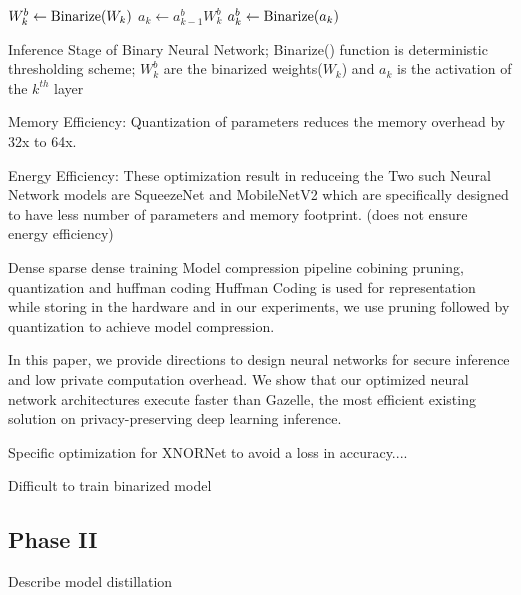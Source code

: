 \begin{algorithm}
\begin{algorithmic}
        \STATE $W_k^b \leftarrow {\rm Binarize}(W_k)$
        \STATE $a_k \leftarrow a_{k-1}^b W_k^b$
            \STATE $a_k^b \leftarrow {\rm Binarize}(a_k)$
        \ENDIF
    \ENDFOR

\end{algorithmic}
\caption{
Inference Stage of Binary Neural Network; Binarize() function is deterministic thresholding scheme; $W_k^b$ are the binarized weights($W_k$) and $a_k$ is the activation of the $k^{th}$ layer
}
\label{alg:train}
\end{algorithm}

Memory Efficiency: Quantization of parameters reduces the memory overhead by 32x to 64x.

Energy Efficiency: These optimization result in reduceing the
Two such Neural Network models are SqueezeNet \cite{DBLP:journals/corr/IandolaMAHDK16} and MobileNetV2 \cite{conf/cvpr/SandlerHZZC18} which are specifically designed to have less number of parameters and memory footprint. (does not ensure energy efficiency)

Dense sparse dense training \cite{DBLP:journals/corr/HanPNMTECTD16}
Model compression pipeline cobining pruning, quantization and huffman coding \cite{DBLP:journals/corr/HanMD15}
Huffman Coding is used for representation while storing in the hardware and in our experiments, we use pruning followed by quantization to achieve model compression.


In this paper, we provide directions to design neural networks for secure inference and low private computation overhead. We show that our optimized neural network architectures execute faster than Gazelle, the most efficient existing solution on privacy-preserving deep learning inference.

Specific optimization for XNORNet to avoid a loss in accuracy....


Difficult to train binarized model~\cite{AAAI1714619}




\subsection{Phase II}


Describe model distillation

